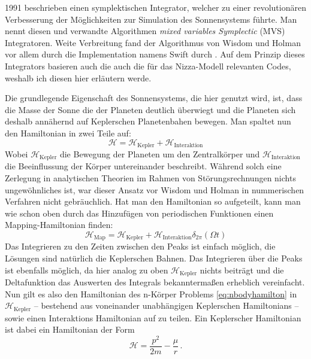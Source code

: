 \documentclass[12pt,a4paper,twoside]{article}
\renewcommand{\cite}{\citep}
\renewcommand{\H}{\mathcal H}
\begin{document}
1991 beschrieben \cite{Wisdom1991} einen symplektischen Integrator, welcher zu einer revolutionären Verbesserung der Möglichkeiten zur Simulation des Sonnensystems führte.
Man nennt diesen und verwandte Algorithmen \textit{mixed variables Symplectic} (MVS) Integratoren. 
Weite Verbreitung fand der Algorithmus von Wisdom und Holman vor allem durch die Implementation namens Swift durch \cite{Levison1994}.
Auf dem Prinzip dieses Integrators basieren auch die auch die für das Nizza-Modell relevanten Codes, weshalb ich diesen hier erläutern werde.

Die grundlegende Eigenschaft des Sonnensystems, die hier genutzt wird, ist, dass die Masse der Sonne die der Planeten deutlich überwiegt und die Planeten sich deshalb annähernd auf Keplerschen Planetenbahen bewegen. Man spaltet nun den Hamiltonian in zwei Teile auf:
\begin{equation}
\H = \H_{\mathrm{Kepler}} + \H_{\mathrm{Interaktion}}
\end{equation}
Wobei $\H_{\mathrm{Kepler}}$ die Bewegung der Planeten um den Zentralkörper und $\H_{\mathrm{Interaktion}}$ die Beeinflussung der Körper untereinander beschreibt. Während solch eine Zerlegung in analytischen Theorien im Rahmen von Störungsrechnungen nichts ungewöhnliches ist, war dieser Ansatz vor Wisdom und Holman in nummerischen Verfahren nicht gebräuchlich\cite{Wisdom1991}. Hat man den Hamiltonian so aufgeteilt, kann man wie schon oben durch das Hinzufügen von periodischen Funktionen einen Mapping-Hamiltonian finden:
\begin{equation}
\H_{\mathrm{Map}} = \H_{\mathrm{Kepler}} + \H_{\mathrm{Interaktion}}\delta_{2\pi}(\Omega t)
\end{equation} %
Das Integrieren zu den Zeiten zwischen den Peaks ist einfach möglich, die Lösungen sind natürlich die Keplerschen Bahnen. Das Integrieren über die Peaks ist ebenfalls möglich, da hier analog zu oben $\H_{\mathrm{Kepler}}$ nichts beiträgt und die Deltafunktion das Auswerten des Integrals bekanntermaßen erheblich vereinfacht\cite{Wisdom1991}. %
Nun gilt es also den Hamiltonian des n-Körper Problems \ref{eq:nbodyhamilton} in $\H_{\mathrm{Kepler}}$ -- bestehend aus voneinander unabhängigen Keplerschen Hamiltonians -- sowie einen Interaktions Hamiltonian auf zu teilen. Ein Keplerscher Hamiltonian ist dabei ein Hamiltonian der Form
\begin{equation}
\H = \frac{p^2}{2m} - \frac{\mu}{r} \,.
\end{equation}
\end{document}
